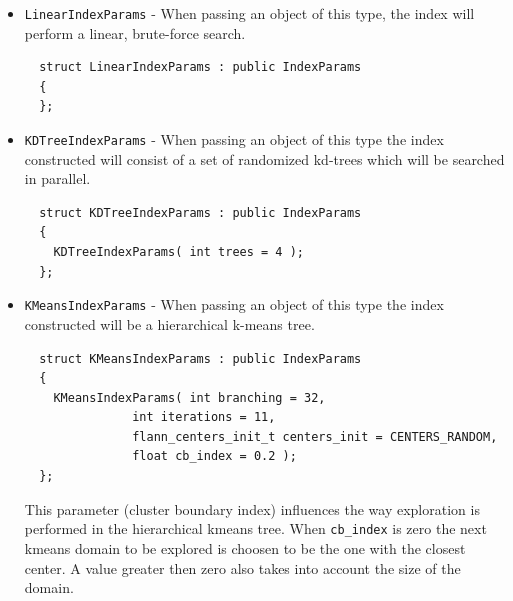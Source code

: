 \begin {itemize}
 \item \texttt{LinearIndexParams} - When passing an object of this type, the index will perform a linear, brute-force search.
\begin{lstlisting}
  struct LinearIndexParams : public IndexParams 
  {
  };
\end{lstlisting}

 \item \texttt{KDTreeIndexParams} - When passing an object of this type the index constructed will consist of a set 
of randomized kd-trees which will be searched in parallel.
\begin{lstlisting}
  struct KDTreeIndexParams : public IndexParams 
  {
	KDTreeIndexParams( int trees = 4 );
  };
\end{lstlisting}
\begin{description}
\end{description}

 \item \texttt{KMeansIndexParams}  - When passing an object of this type the index constructed will be a hierarchical k-means tree. 
\begin{lstlisting}
  struct KMeansIndexParams : public IndexParams 
  {
	KMeansIndexParams( int branching = 32, 
			   int iterations = 11,
			   flann_centers_init_t centers_init = CENTERS_RANDOM, 
			   float cb_index = 0.2 );	
  };
\end{lstlisting}
\begin{description}
 { This parameter (cluster boundary index) influences the
		  way exploration is performed in the hierarchical kmeans tree. When \texttt{cb\_index} is zero
		  the next kmeans domain to be explored is choosen to be the one with the closest center. 
		  A value greater then zero also takes into account the size of the domain.}
\end{description}


\end{itemize}
